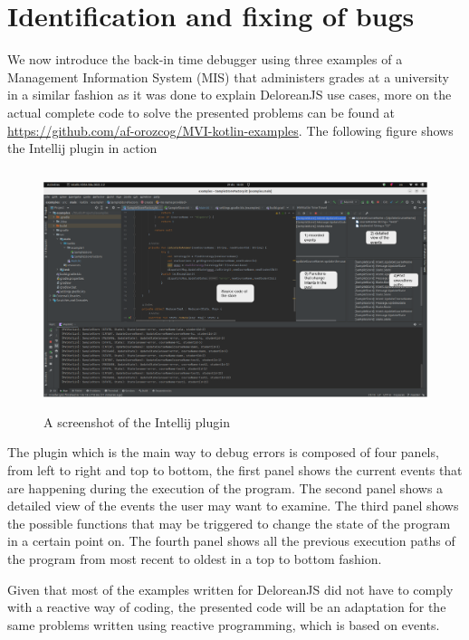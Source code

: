 
\chapter{Identification and fixing of bugs}
\label{cha:features}

We now introduce the back-in time debugger using three examples of a Management Information System (MIS) that administers grades at a university in a similar fashion as it was done to explain DeloreanJS use cases, more on the actual complete code to solve the presented problems can be found at \url{https://github.com/af-orozcog/MVI-kotlin-examples}. The following figure shows the Intellij plugin in action

\begin{figure}[h]
\centering
\includegraphics[height=7cm,width=13cm]{figures/Intellij}
\caption{A screenshot of the Intellij plugin}
\label{fig: A screenshot of the Intellij plugin}
\end{figure}

The plugin which is the main way to debug errors is composed of four panels, from left to right and top to bottom, the first panel shows the current events that are happening during the execution of the program. The second panel shows a detailed view of the events the user may want to examine. The third panel shows the possible functions that may be triggered to change the state of the program in a certain point on. The fourth panel shows all the previous execution paths of the program from most recent to oldest in a top to bottom fashion.

Given that most of the examples written for DeloreanJS did not have to comply with a reactive way of coding, the presented code will be an adaptation for the same problems written using reactive programming, which is based on events.

